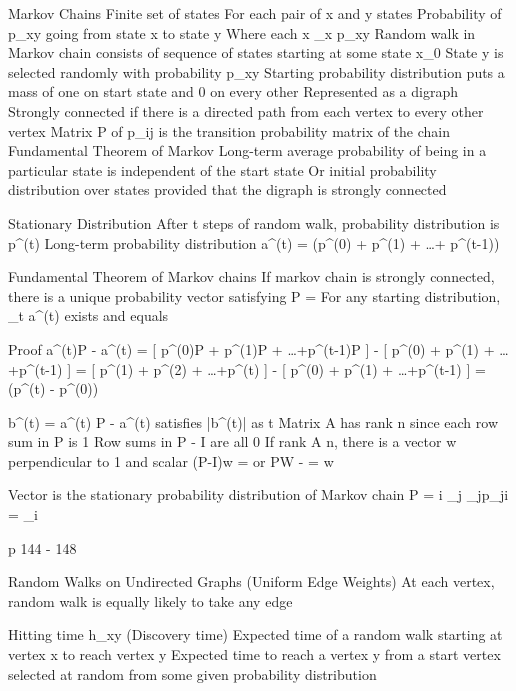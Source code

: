 Markov Chains
	Finite set of states
		For each pair of x and y states
			Probability of p_{xy} going from state x to state y
				Where each x \sum_{x} p_{xy}
	Random walk in Markov chain consists of sequence of states starting at some state x_{0}
		State y is selected randomly with probability p_{xy}
			Starting probability distribution puts a mass of one on start state and 0 on every other
	Represented as a digraph
		Strongly connected if there is a directed path from each vertex to every other vertex
		Matrix P of p_{ij} is the transition probability matrix of the chain
	Fundamental Theorem of Markov
		Long-term average probability of being in a particular state is independent of the start state
		Or initial probability distribution over states provided that the digraph is strongly connected


Stationary Distribution
	After t steps of random walk, probability distribution is p^{(t)}
	Long-term probability distribution
		a^{(t)} = (p^{(0)} + p^{(1)} + \dots + p^{(t-1)})

	Fundamental Theorem of Markov chains
		If markov chain is strongly connected, there is a unique probability vector \pi satisfying \pi P = \pi
			For any starting distribution, \lim_{t\rightarrow \infty} a^{(t)} exists and equals \pi

			Proof
				a^{(t)}P - a^{(t)} =  [ p^{(0)}P + p^{(1)}P + \dots +p^{(t-1)}P ] -  [ p^{(0)} + p^{(1)} + \dots +p^{(t-1)} ]
				=  [ p^{(1)} + p^{(2)} + \dots +p^{(t)} ] -  [ p^{(0)} + p^{(1)} + \dots +p^{(t-1)} ]
				=  (p^{(t)} - p^{(0)})

				b^{(t)} = a^{(t)} P - a^{(t)} satisfies |b^{(t)}| \leq {}  as t \rightarrow \infty
					Matrix A has rank n since each row sum in P is 1
					Row sums in P - I are all 0
					If rank A \lt n, there is a vector w perpendicular to 1 and scalar \alpha
						(P-I)w = \alpha 1 or PW -  = w

					Vector \pi is the stationary probability distribution of Markov chain
						\pi P = \pi
							\forall i \sum_{j} \pi_{j}p_{ji} = \pi_{i}



p 144 - 148


Random Walks on Undirected Graphs (Uniform Edge Weights)
	At each vertex, random walk is equally likely to take any edge

	Hitting time h_{xy} (Discovery time)
		Expected time of a random walk starting at vertex x to reach vertex y
		Expected time to reach a vertex y from a start vertex selected at random from some given probability distribution

